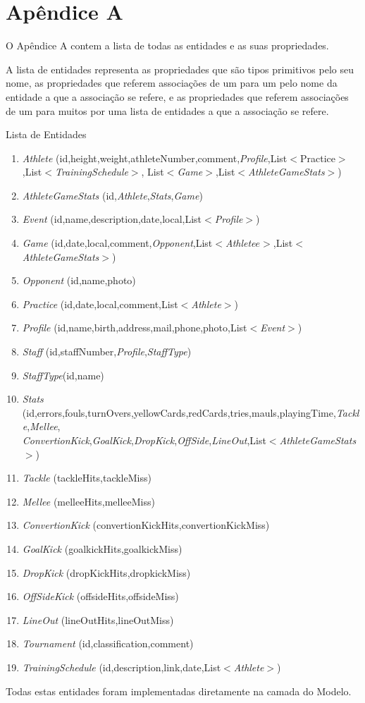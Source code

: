 %
%
\chapter{Apêndice A} \label{ap:exemplo}
O Apêndice A contem a lista de todas as entidades e as suas propriedades. 

A lista de entidades representa as propriedades que são tipos primitivos pelo seu nome, as propriedades que referem associações de um para um pelo nome da entidade a que a associação se refere, e as propriedades que referem associações de um para muitos por uma lista de entidades a que a associação se refere.


Lista de Entidades
\begin{enumerate}
	\item \emph{Athlete}	(id,height,weight,athleteNumber,comment,\emph{Profile},List$<$Practice$>$,List$<$\emph{TrainingSchedule}$>$,
	List$<$\emph{Game}$>$,List$<$\emph{AthleteGameStats}$>$)
	\item \emph{AthleteGameStats} (id,\emph{Athlete},\emph{Stats},\emph{Game})
	\item \emph{Event} (id,name,description,date,local,List$<$\emph{Profile}$>$)
	\item \emph{Game} (id,date,local,comment,\emph{Opponent},List$<$\emph{Athlete}$e>$,List$<$\emph{AthleteGameStats}$>$)
	\item \emph{Opponent}
	(id,name,photo)
	\item \emph{Practice} (id,date,local,comment,List$<$\emph{Athlete}$>$)
	\item \emph{Profile} (id,name,birth,address,mail,phone,photo,List$<$\emph{Event}$>$)
	\item \emph{Staff} (id,staffNumber,\emph{Profile},\emph{StaffType})
	\item \emph{StaffType}(id,name)
	\item \emph{Stats} (id,errors,fouls,turnOvers,yellowCards,redCards,tries,mauls,playingTime,\emph{Tackle},\emph{Mellee},\\
	\emph{ConvertionKick},\emph{GoalKick},\emph{DropKick},\emph{OffSide},\emph{LineOut},List$<$\emph{AthleteGameStats}$>$)
	\item \emph{Tackle} (tackleHits,tackleMiss)
	\item \emph{Mellee} (melleeHits,melleeMiss)
	\item \emph{ConvertionKick} (convertionKickHits,convertionKickMiss)
	\item \emph{GoalKick} (goalkickHits,goalkickMiss)
	\item \emph{DropKick} (dropKickHits,dropkickMiss)
	\item \emph{OffSideKick} (offsideHits,offsideMiss)
	\item \emph{LineOut} (lineOutHits,lineOutMiss)
	\item \emph{Tournament} (id,classification,comment)
	\item \emph{TrainingSchedule} (id,description,link,date,List$<$\emph{Athlete}$>$)
\end{enumerate}
Todas estas entidades foram implementadas diretamente na camada do Modelo.
\newpage